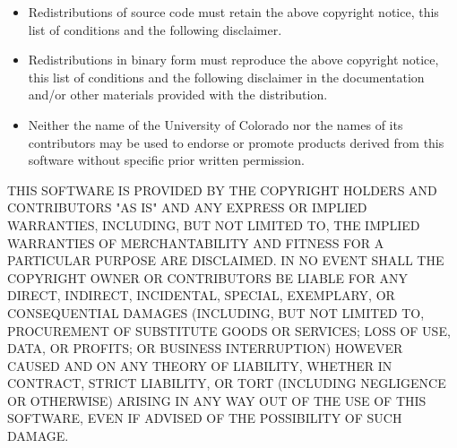\documentclass{article}
\begin{document}
\begin{itemize}
\item
Redistributions of source code must retain the above copyright
notice, this list of conditions and the following disclaimer.
\item
Redistributions in binary form must reproduce the above copyright
notice, this list of conditions and the following disclaimer in the
documentation and/or other materials provided with the distribution.
\item
Neither the name of the University of Colorado nor the names of its
contributors may be used to endorse or promote products derived from
this software without specific prior written permission.
\end{itemize}
THIS SOFTWARE IS PROVIDED BY THE COPYRIGHT HOLDERS AND CONTRIBUTORS
"AS IS" AND ANY EXPRESS OR IMPLIED WARRANTIES, INCLUDING, BUT NOT
LIMITED TO, THE IMPLIED WARRANTIES OF MERCHANTABILITY AND FITNESS
FOR A PARTICULAR PURPOSE ARE DISCLAIMED. IN NO EVENT SHALL THE
COPYRIGHT OWNER OR CONTRIBUTORS BE LIABLE FOR ANY DIRECT, INDIRECT,
INCIDENTAL, SPECIAL, EXEMPLARY, OR CONSEQUENTIAL DAMAGES (INCLUDING,
BUT NOT LIMITED TO, PROCUREMENT OF SUBSTITUTE GOODS OR SERVICES;
LOSS OF USE, DATA, OR PROFITS; OR BUSINESS INTERRUPTION) HOWEVER
CAUSED AND ON ANY THEORY OF LIABILITY, WHETHER IN CONTRACT, STRICT
LIABILITY, OR TORT (INCLUDING NEGLIGENCE OR OTHERWISE) ARISING IN
ANY WAY OUT OF THE USE OF THIS SOFTWARE, EVEN IF ADVISED OF THE
POSSIBILITY OF SUCH DAMAGE.




\end{document}
